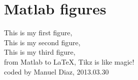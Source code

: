 \documentclass{article}
\begin{document}
\section{Matlab figures}

This is my first figure, \\
 

This is my second figure, \\


This is my third figure, \\


from Matlab to \LaTeX, Tikz is like magic! \\
coded by Manuel Diaz, 2013.03.30
\end{document}
